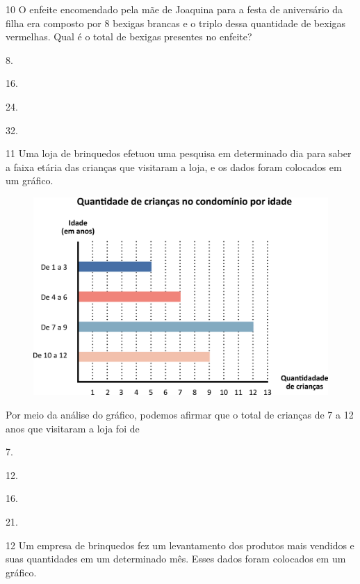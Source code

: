 \num{10} O enfeite encomendado pela mãe de Joaquina para a festa de aniversário da filha era composto por 8 bexigas brancas e o triplo dessa quantidade de bexigas vermelhas. Qual é o total de bexigas presentes no enfeite?

\begin{escolha}
\item
  8.
\item
  16.
\item
  24.
\item
  32.
\end{escolha}

\num{11} Uma loja de brinquedos efetuou uma pesquisa em determinado dia para saber a faixa etária das crianças que visitaram a loja, e os dados foram
colocados em um gráfico.

\begin{figure}[htpb!]
\centering
\includegraphics[width=\textwidth]{./media/image118.png}
\end{figure}

Por meio da análise do gráfico, podemos afirmar que o total de crianças de 7 a 12 anos que visitaram a loja foi de

\begin{escolha}
\item
  7.
\item
  12.
\item
  16.
\item
  21.
\end{escolha}


\pagebreak
\num{12} Um empresa de brinquedos fez um levantamento dos produtos mais vendidos e suas quantidades em um determinado mês. Esses dados foram colocados em um gráfico.


